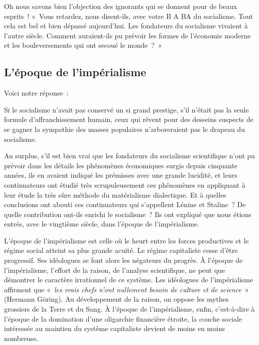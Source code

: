 \documentclass[french,twoside]{book} %
\begin{document}
\noindent Oh nous savons bien l’objection des ignorants qui se donnent pour de beaux esprits ! « Vous retardez, nous disent-ils, avec votre B A BA du socialisme. Tout cela est bel et bien dépassé aujourd’hui. Les fondateurs du socialisme vivaient à l’autre siècle. Comment auraient-ils pu prévoir les formes de l’économie moderne et les bouleversements qui ont secoué le monde ? »
\subsection[L’époque de l’impérialisme]{L’époque de l’impérialisme}
\noindent Voici notre réponse :\par
Si le socialisme n’avait pas conservé un si grand prestige, s’il n’était pas la seule formule d’affranchissement humain, ceux qui rêvent pour des desseins suspects de se gagner la sympathie des masses populaires n’arboreraient pas le drapeau du socialisme.\par
Au surplus, s’il est bien vrai que les fondateurs du socialisme scientifique n’ont pu prévoir dans les détails les phénomènes économiques surgis depuis cinquante années, ils en avaient indiqué les prémisses avec une grande lucidité, et leurs continuateurs ont étudié très scrupuleusement ces phénomènes en appliquant à leur étude la très sûre méthode du matérialisme dialectique. Et à quelles conclusions ont abouti ces continuateurs qui s’appellent Lénine et Staline ? De quelle contribution ont-ils enrichi le socialisme ? Ils ont expliqué que nous étions entrés, avec le vingtième siècle, dans l’époque de l’impérialisme.\par
L’époque de l’impérialisme est celle où le heurt entre les forces productives et le régime social atteint sa plus grande acuité. Le régime capitaliste cesse d’être progressif. Ses idéologues se font alors les négateurs du progrès. À l’époque de l’impérialisme, l’effort de la raison, de l’analyse scientifique, ne peut que démontrer le caractère irrationnel de ce système. Les idéologues de l’impérialisme affirment que « \emph{les vrais chefs n’ont nullement besoin de culture et de science} » (Hermann Göring). Au développement de la raison, on oppose les mythes grossiers de la Terre et du Sang. À l’époque de l’impérialisme, enfin, c’est-à-dire à l’époque de la domination d’une oligarchie financière étroite, la couche sociale intéressée au maintien du système capitaliste devient de moins en moins nombreuse.
\end{document}
